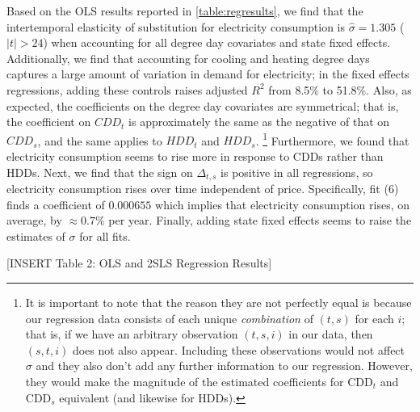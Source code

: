 \documentclass[11pt,a4paper,leqno]{extarticle}
\begin{document}
	
	Based on the OLS results reported in \autoref{table:regresults}, we find that the intertemporal elasticity of substitution for electricity consumption is $\hat{\sigma}  = 1.305$ ($|t| > 24$) when accounting for all degree day covariates and state fixed effects. Additionally, we find that accounting for cooling and heating degree days captures a large amount of variation in demand for electricity; in the fixed effects regressions, adding these controls raises adjusted $R^2$ from 8.5\% to 51.8\%. Also, as expected, the coefficients on the degree day covariates are symmetrical; that is, the coefficient on $CDD_{t}$ is approximately the same as the negative of that on $CDD_{s}$, and the same applies to $HDD_{t}$ and $HDD_{s}$. \footnote{It is important to note that the reason they are not perfectly equal is because our regression data consists of each unique \textit{combination} of $(t,s)$ for each $i$; that is, if we have an arbitrary observation $(t,s,i)$ in our data, then $(s,t,i)$ does not also appear. Including these observations would not affect $\sigma$ and they also don't add any further information to our regression. However, they would make the magnitude of the estimated coefficients for  CDD$_t$ and CDD$_s$ equivalent (and likewise for HDDs). }  Furthermore, we found that electricity consumption seems to rise more in response to CDDs rather than HDDs.  Next, we find that the sign on $\Delta_{t,s}$ is positive in all regressions, so electricity consumption rises over time independent of price. Specifically, fit (6) finds a coefficient of $0.000655$ which implies that electricity consumption rises, on average, by $\approx 0.7\%$ per year. Finally, adding state fixed effects seems to raise the estimates of $\sigma$ for all fits. 
	
	\vspace{0.15in}
	\begin{center}
		[INSERT Table 2: OLS and 2SLS Regression Results]
	\end{center}
	\vspace{0.15in}
	
\end{document}
